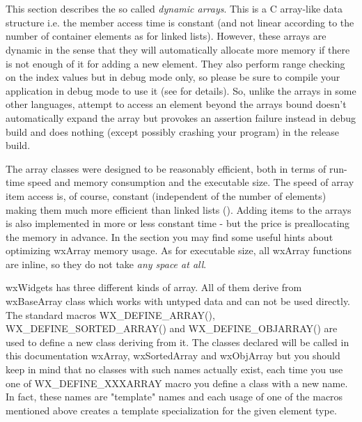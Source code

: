 \section{}\label{wxarray}

This section describes the so called {\it dynamic arrays}. This is a C
array-like data structure i.e. the member access time is constant (and not
linear according to the number of container elements as for linked lists). However, these
arrays are dynamic in the sense that they will automatically allocate more
memory if there is not enough of it for adding a new element. They also perform
range checking on the index values but in debug mode only, so please be sure to
compile your application in debug mode to use it (see  for
details). So, unlike the arrays in some other
languages, attempt to access an element beyond the arrays bound doesn't
automatically expand the array but provokes an assertion failure instead in
debug build and does nothing (except possibly crashing your program) in the
release build.

The array classes were designed to be reasonably efficient, both in terms of
run-time speed and memory consumption and the executable size. The speed of
array item access is, of course, constant (independent of the number of elements)
making them much more efficient than linked lists ().
Adding items to the arrays is also implemented in more or less constant time -
but the price is preallocating the memory in advance. In the  section
you may find some useful hints about optimizing wxArray memory usage. As for executable size, all
wxArray functions are inline, so they do not take {\it any space at all}.

wxWidgets has three different kinds of array. All of them derive from
wxBaseArray class which works with untyped data and can not be used directly.
The standard macros WX\_DEFINE\_ARRAY(), WX\_DEFINE\_SORTED\_ARRAY() and
WX\_DEFINE\_OBJARRAY() are used to define a new class deriving from it. The
classes declared will be called in this documentation wxArray, wxSortedArray and
wxObjArray but you should keep in mind that no classes with such names actually
exist, each time you use one of WX\_DEFINE\_XXXARRAY macro you define a class
with a new name. In fact, these names are "template" names and each usage of one
of the macros mentioned above creates a template specialization for the given
element type.

